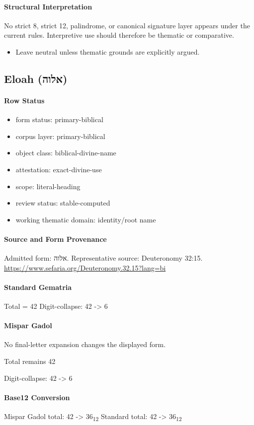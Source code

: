 \paragraph{Structural Interpretation}
No strict 8, strict 12, palindrome, or canonical signature layer appears under the current rules. Interpretive use should therefore be thematic or comparative.

\begin{itemize}
\item Leave neutral unless thematic grounds are explicitly argued.
\end{itemize}

\subsection{Eloah (אלוה)}
\paragraph{Row Status}
\begin{itemize}
\item form status: primary-biblical
\item corpus layer: primary-biblical
\item object class: biblical-divine-name
\item attestation: exact-divine-use
\item scope: literal-heading
\item review status: stable-computed
\item working thematic domain: identity/root name
\end{itemize}
\paragraph{Source and Form Provenance}
Admitted form: אלוה.
Representative source: Deuteronomy 32:15.
\url{https://www.sefaria.org/Deuteronomy.32.15?lang=bi}
\paragraph{Standard Gematria}
Total = 42
Digit-collapse: 42 -> 6
\paragraph{Mispar Gadol}
No final-letter expansion changes the displayed form.

Total remains 42

Digit-collapse: 42 -> 6
\paragraph{Base12 Conversion}
Mispar Gadol total: 42 -> 36\textsubscript{12}
Standard total: 42 -> 36\textsubscript{12}
